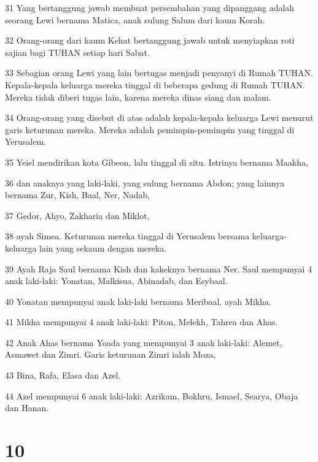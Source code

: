 \par 31 Yang bertanggung jawab membuat persembahan yang dipanggang adalah seorang Lewi bernama Matica, anak sulung Salum dari kaum Korah.
\par 32 Orang-orang dari kaum Kehat bertanggung jawab untuk menyiapkan roti sajian bagi TUHAN setiap hari Sabat.
\par 33 Sebagian orang Lewi yang lain bertugas menjadi penyanyi di Rumah TUHAN. Kepala-kepala keluarga mereka tinggal di beberapa gedung di Rumah TUHAN. Mereka tidak diberi tugas lain, karena mereka dinas siang dan malam.
\par 34 Orang-orang yang disebut di atas adalah kepala-kepala keluarga Lewi menurut garis keturunan mereka. Mereka adalah pemimpin-pemimpin yang tinggal di Yerusalem.
\par 35 Yeiel mendirikan kota Gibeon, lalu tinggal di situ. Istrinya bernama Maakha,
\par 36 dan anaknya yang laki-laki, yang sulung bernama Abdon; yang lainnya bernama Zur, Kish, Baal, Ner, Nadab,
\par 37 Gedor, Ahyo, Zakharia dan Miklot,
\par 38 ayah Simea. Keturunan mereka tinggal di Yerusalem bersama keluarga-keluarga lain yang sekaum dengan mereka.
\par 39 Ayah Raja Saul bernama Kish dan kakeknya bernama Ner. Saul mempunyai 4 anak laki-laki: Yonatan, Malkisua, Abinadab, dan Esybaal.
\par 40 Yonatan mempunyai anak laki-laki bernama Meribaal, ayah Mikha.
\par 41 Mikha mempunyai 4 anak laki-laki: Piton, Melekh, Tahrea dan Ahas.
\par 42 Anak Ahas bernama Yoada yang mempunyai 3 anak laki-laki: Alemet, Asmawet dan Zimri. Garis keturunan Zimri ialah Moza,
\par 43 Bina, Rafa, Elasa dan Azel.
\par 44 Azel mempunyai 6 anak laki-laki: Azrikam, Bokhru, Ismael, Searya, Obaja dan Hanan.

\chapter{10}


